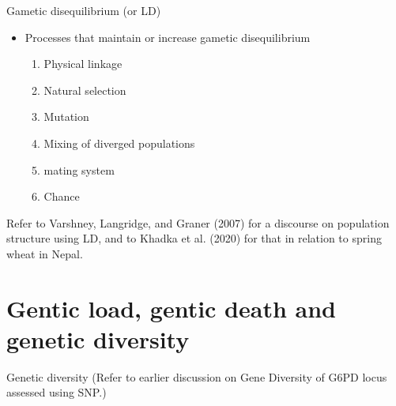 \documentclass[11pt,dvipsnames,ignorenonframetext,aspectratio=169]{beamer}
\providecommand{\tightlist}{%
  \setlength{\itemsep}{0pt}\setlength{\parskip}{0pt}}
\begin{document}
\begin{frame}{Gametic disequilibrium (or LD)}
\protect\hypertarget{gametic-disequilibrium-or-ld}{}
\begin{itemize}
\tightlist
\item
  Processes that maintain or increase gametic disequilibrium

  \begin{enumerate}
  \tightlist
  \item
    Physical linkage\\
  \item
    Natural selection\\
  \item
    Mutation\\
  \item
    Mixing of diverged populations\\
  \item
    mating system\\
  \item
    Chance
  \end{enumerate}
\end{itemize}

Refer to Varshney, Langridge, and Graner (2007) for a discourse on
population structure using LD, and to Khadka et al. (2020) for that in
relation to spring wheat in Nepal.
\end{frame}

\hypertarget{gentic-load-gentic-death-and-genetic-diversity}{%
\section{Gentic load, gentic death and genetic
diversity}\label{gentic-load-gentic-death-and-genetic-diversity}}

\begin{frame}{Genetic diversity}
\protect\hypertarget{genetic-diversity}{}
(Refer to earlier discussion on Gene Diversity of G6PD locus assessed
using SNP.)
\end{frame}
\end{document}
